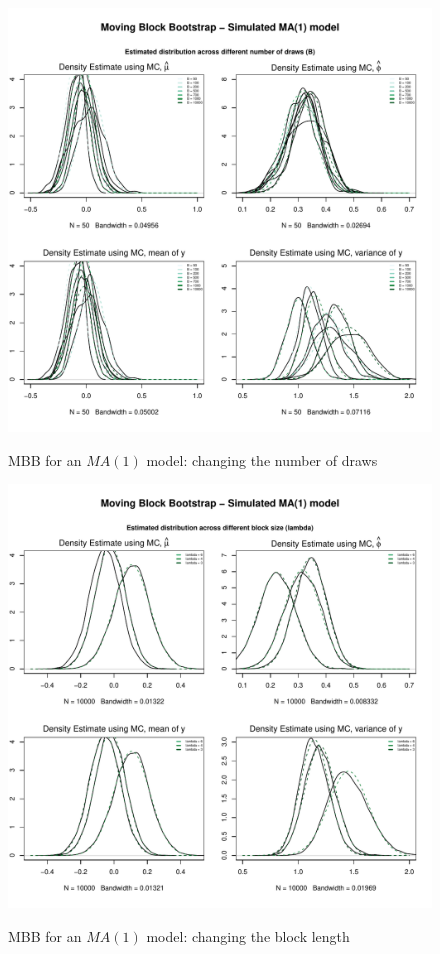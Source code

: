 \documentclass{article}
\begin{document}
\begin{figure}[hbt!]
\includegraphics[width=\textwidth]{plots/MBB_MA1_densities_diff_drawsB}
\label{fig:MBB_MA1_densities_diff_drawsB}
\caption{MBB for an $MA(1)$ model: changing the number of draws}
\centering
\end{figure}

\begin{figure}[hbt!]
\includegraphics[width=\textwidth]{plots/MBB_MA1_densities_diff_blocklength}
\label{fig:MBB_MA1_densities_diff_blocklength}
\caption{MBB for an $MA(1)$ model: changing the block length}
\centering
\end{figure}
\end{document}
